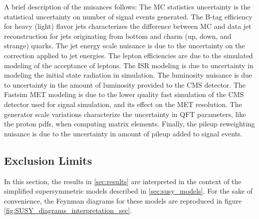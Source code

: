     A brief description of the nuisances follows: The MC statistics uncertainty is the statistical uncertainty on number of signal events generated. The B-tag efficiency for heavy (light) flavor jets characterizes the difference between MC and data jet reconstruction for jets originating from bottom and charm (up, down, and strange) quarks. The jet energy scale nuisance is due to the uncertainty on the correction applied to jet energies. The lepton efficiencies are due to the simulated modeling of the acceptance of leptons. The ISR modeling is due to uncertainty in modeling the initial state radiation in simulation. The luminosity nuisance is due to uncertainty in the amount of luminosity provided to the CMS detector. The Fastsim MET modeling is due to the lower quality fast simulation of the CMS detector used for signal simulation, and its effect on the MET resolution. The generator scale variations characterize the uncertainty in QFT parameters, like the proton pdfs, when computing matrix elements. Finally, the pileup reweighting nuisance is due to the uncertainty in amount of pileup added to signal events.

  \subsection{Exclusion Limits} \label{sec:exclusion_limits}

    In this section, the results in \ref{sec:results} are interpreted in the context of the simplified supersymmetric models described in \ref{sec:susy_models}. For the sake of convenience, the Feynman diagrams for these models are reproduced in figure \ref{fig:SUSY_diagrams_interpretation_sec}.

